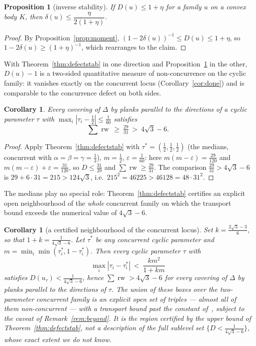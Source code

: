 \documentclass[11pt,reqno]{amsart}
\theoremstyle{plain}
\newtheorem{proposition}[theorem]{Proposition}
\newtheorem{corollary}[theorem]{Corollary}
\theoremstyle{definition}
\theoremstyle{remark}
\newcommand{\rw}{\operatorname{rw}}
\begin{document}
\begin{proposition}[inverse stability]\label{prop:invstab}
If $D(u)\le1+\eta$ for a family $u$ on a convex body $K$, then
$\delta(u)\le\dfrac{\eta}{2(1+\eta)}$.
\end{proposition}

\begin{proof}
By Proposition~\ref{prop:moment}, $(1-2\delta(u))^{-1}\le D(u)\le1+\eta$, so
$1-2\delta(u)\ge(1+\eta)^{-1}$, which rearranges to the claim.
\end{proof}

With Theorem~\ref{thm:defectstab} in one direction and
Proposition~\ref{prop:invstab} in the other, $D(u)-1$ is a two-sided
quantitative measure of non-concurrence on the cyclic family: it vanishes
exactly on the concurrent locus (Corollary~\ref{cor:done}) and is comparable
to the concurrence defect on both sides.

\begin{corollary}\label{cor:beyond}
Every covering of $\Delta$ by planks parallel to the directions of a cyclic
parameter $\tau$ with $\max_i|\tau_i-\tfrac12|\le\tfrac1{60}$ satisfies
\[
\sum\rw\ \ge\ \tfrac{29}{31}\ >\ 4\sqrt3-6 .
\]
\end{corollary}

\begin{proof}
Apply Theorem~\ref{thm:defectstab} with $\tau^*=(\tfrac12,\tfrac12,\tfrac12)$
(the medians, concurrent with $\alpha=\beta=\gamma=\tfrac13$), $m=\tfrac12$,
$\varepsilon=\tfrac1{60}$: here $m(m-\varepsilon)=\tfrac{29}{120}$ and
$m(m-\varepsilon)+\varepsilon=\tfrac{31}{120}$, so
$D\le\tfrac{31}{29}$ and $\sum\rw\ge\tfrac{29}{31}$. The comparison
$\tfrac{29}{31}>4\sqrt3-6$ is $29+6\cdot31=215>124\sqrt3$, i.e.\
$215^2=46225>46128=48\cdot31^2$.
\end{proof}

The medians play no special role: Theorem~\ref{thm:defectstab} certifies an
explicit open neighbourhood of the \emph{whole} concurrent family on which
the transport bound exceeds the numerical value of $4\sqrt3-6$.

\begin{corollary}[a certified neighbourhood of the concurrent locus]
\label{cor:region}
Set $k=\tfrac{2\sqrt3-3}6$, so that $1+k=\tfrac1{4\sqrt3-6}$. Let $\tau^*$ be
any concurrent cyclic parameter and $m=\min_i\min(\tau_i^*,1-\tau_i^*)$. Then
every cyclic parameter $\tau$ with
\[
\max_i|\tau_i-\tau_i^*|\ <\ \frac{km^2}{1+km}
\]
satisfies $D(u_\tau)<\tfrac1{4\sqrt3-6}$, hence $\sum\rw>4\sqrt3-6$ for every
covering of $\Delta$ by planks parallel to the directions of $\tau$. The
union of these boxes over the two-parameter concurrent family is an explicit
open set of triples --- almost all of them non-concurrent --- with a
transport bound past the constant of~\cite{BY26}, subject to the caveat of
Remark~\ref{rem:beyond}. It is the region certified by the upper bound of
Theorem~\ref{thm:defectstab}, not a description of the full sublevel set
$\{D<\tfrac1{4\sqrt3-6}\}$, whose exact extent we do not know.
\end{corollary}
\end{document}
